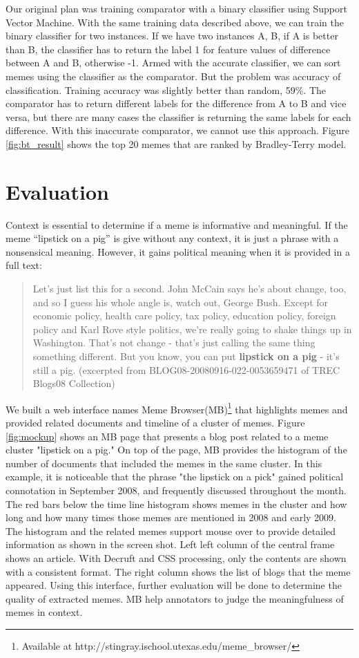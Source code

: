 \documentclass{sig-alternate}
\begin{document}
Our original plan was training comparator with a binary classifier using Support Vector Machine. With the same training data described above, we can train the binary classifier for two instances. If we have two instances A, B, if A is better than B, the classifier has to return the label 1 for feature values of difference between A and B, otherwise -1. Armed with the accurate classifier, we can sort memes using the classifier as the comparator. But the problem was accuracy of classification. Training accuracy was slightly better than random, 59\%. The comparator has to return different labels for the difference from A to B and vice versa, but there are many cases the classifier is returning the same labels for each difference. With this inaccurate comparator, we cannot use this approach. Figure \ref{fig:bt_result} shows the top 20 memes that are ranked by Bradley-Terry model.

\section{Evaluation}

Context is essential to determine if a meme is informative and meaningful. If the meme ``lipstick on a pig'' is give without any context, it is just a phrase with a nonsensical meaning. However, it gains political meaning when it is provided in a full text: 
\begin{quote}
Let's just list this for a second. John McCain says he's about change, too, and so I guess his whole angle is, watch out, George Bush. Except for economic policy, health care policy, tax policy, education policy, foreign policy and Karl Rove style politics, we're really going to shake things up in Washington. That's not change - that's just calling the same thing something different. But you know, you can put \textbf{lipstick on a pig} - it's still a pig. (excerpted from BLOG08-20080916-022-0053659471 of TREC Blogs08 Collection)
\end{quote}

We built a web interface names Meme Browser(MB)\footnote{Available at http://stingray.ischool.utexas.edu/meme\_browser/} that highlights memes and provided related documents and timeline of a cluster of memes. Figure \ref{fig:mockup} shows an MB page that presents a blog post related to a meme cluster "lipstick on a pig." On top of the page, MB provides the histogram of the number of documents that included the memes in the same cluster. In this example, it is noticeable that the phrase "the lipstick on a pick" gained political connotation in September 2008, and frequently discussed throughout the month. The red bars below the time line histogram shows memes in the cluster and how long  and how many times those memes are mentioned in 2008 and early 2009. The histogram and the related memes support mouse over to provide detailed information as shown in the screen shot. Left left column of the central frame shows an article. With Decruft and CSS processing, only the contents are shown with a consistent format. The right column shows the list of blogs that the meme appeared. Using this interface, further evaluation will be done to determine the quality of extracted memes. MB help annotators to judge the meaningfulness of memes in context.
\end{document}
